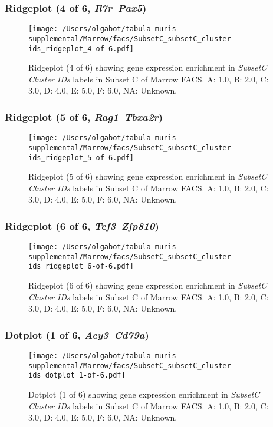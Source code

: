 \clearpage

\subsubsection{Ridgeplot (4 of 6, \emph{Il7r}--\emph{Pax5})}
\begin{figure}[h]
\centering
\texttt{[image: /Users/olgabot/tabula-muris-supplemental/Marrow/facs/SubsetC\_subsetC\_cluster-ids\_ridgeplot\_4-of-6.pdf]}

\caption{ Ridgeplot (4 of 6)  showing gene expression enrichment in \emph{SubsetC Cluster IDs} labels in Subset C of Marrow FACS. A: 1.0, B: 2.0, C: 3.0, D: 4.0, E: 5.0, F: 6.0, NA: Unknown.}
\end{figure}


\clearpage

\subsubsection{Ridgeplot (5 of 6, \emph{Rag1}--\emph{Tbxa2r})}
\begin{figure}[h]
\centering
\texttt{[image: /Users/olgabot/tabula-muris-supplemental/Marrow/facs/SubsetC\_subsetC\_cluster-ids\_ridgeplot\_5-of-6.pdf]}

\caption{ Ridgeplot (5 of 6)  showing gene expression enrichment in \emph{SubsetC Cluster IDs} labels in Subset C of Marrow FACS. A: 1.0, B: 2.0, C: 3.0, D: 4.0, E: 5.0, F: 6.0, NA: Unknown.}
\end{figure}


\clearpage

\subsubsection{Ridgeplot (6 of 6, \emph{Tcf3}--\emph{Zfp810})}
\begin{figure}[h]
\centering
\texttt{[image: /Users/olgabot/tabula-muris-supplemental/Marrow/facs/SubsetC\_subsetC\_cluster-ids\_ridgeplot\_6-of-6.pdf]}

\caption{ Ridgeplot (6 of 6)  showing gene expression enrichment in \emph{SubsetC Cluster IDs} labels in Subset C of Marrow FACS. A: 1.0, B: 2.0, C: 3.0, D: 4.0, E: 5.0, F: 6.0, NA: Unknown.}
\end{figure}


\clearpage

\subsubsection{Dotplot (1 of 6, \emph{Acy3}--\emph{Cd79a})}
\begin{figure}[h]
\centering
\texttt{[image: /Users/olgabot/tabula-muris-supplemental/Marrow/facs/SubsetC\_subsetC\_cluster-ids\_dotplot\_1-of-6.pdf]}

\caption{ Dotplot (1 of 6)  showing gene expression enrichment in \emph{SubsetC Cluster IDs} labels in Subset C of Marrow FACS. A: 1.0, B: 2.0, C: 3.0, D: 4.0, E: 5.0, F: 6.0, NA: Unknown.}
\end{figure}


